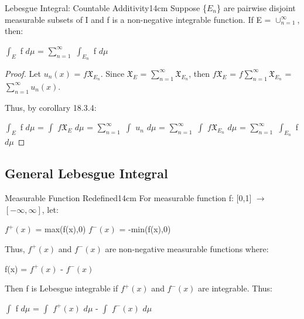     \vspace{0.5cm}



    \begin{corollary}{Lebesgue Integral: Countable Additivity}{14cm}
        Suppose \{$E_n$\} are pairwise disjoint measurable subsets of I
        and f is a non-negative integrable function.
        If E = $\cup_{n=1}^{\infty}$, then:

        \hspace{0.5cm}
        $\int_E$ f $d\mu$
        = $\sum_{n=1}^{\infty}$ $\int_{E_n}$ f $d\mu$
    \end{corollary}

    \begin{proof}
        Let $u_n(x)$ = $f \mathfrak{X}_{E_n}$.
        Since $\mathfrak{X}_E$ = $\sum_{n=1}^{\infty} \mathfrak{X}_{E_n}$, then
        $f \mathfrak{X}_E$
        = $f \sum_{n=1}^{\infty} \mathfrak{X}_{E_n}$
        = $\sum_{n=1}^{\infty} u_n(x)$.

        Thus, by {\color{orange} corollary 18.3.4}:

        \hspace{0.5cm}
        $\int_E$ f $d\mu$
        = $\int$ $f \mathfrak{X}_E$ $d\mu$
        = $\sum_{n=1}^{\infty}$ $\int$ $u_n$ $d\mu$
        = $\sum_{n=1}^{\infty}$ $\int$ $f \mathfrak{X}_{E_n}$ $d\mu$
        = $\sum_{n=1}^{\infty}$ $\int_{E_n}$ f $d\mu$
    \end{proof}

    \newpage





\subsection{ General Lebesgue Integral }

    \begin{definition}{Measurable Function Redefined}{14cm}
        For measurable function f: [0,1] $\rightarrow$ $[-\infty,\infty]$, let:
        
        \hspace{0.5cm}
        $f^+(x)$ = max(f(x),0)
        \hspace{1cm}
        $f^-(x)$ = -min(f(x),0)

        Thus, $f^+(x)$ and $f^-(x)$ are non-negative measurable functions where:
        
        \hspace{0.5cm}
        f(x) = $f^+(x)$ - $f^-(x)$

        Then f is Lebesgue integrable if $f^+(x)$ and $f^-(x)$ are integrable.
        Thus:

        \hspace{0.5cm}
        $\int$ f $d\mu$
        = $\int$ $f^+(x)$ $d\mu$ - $\int$ $f^-(x)$ $d\mu$
    \end{definition}

